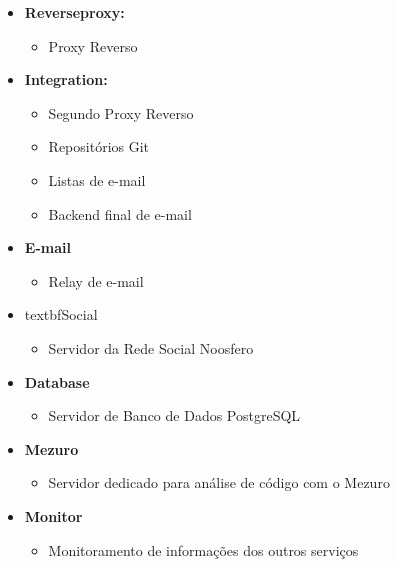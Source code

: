 \begin{itemize}
  \item \textbf{Reverseproxy:}
  \begin{itemize}
    \item Proxy Reverso
  \end{itemize}

  \item \textbf{Integration:}
    \begin{itemize}
      \item Segundo Proxy Reverso
      \item Repositórios Git
      \item Listas de e-mail
      \item Backend final de e-mail
    \end{itemize}

  \item \textbf{E-mail}
  \begin{itemize}
    \item Relay de e-mail
  \end{itemize}

  \item textbf{Social}
  \begin{itemize}
    \item Servidor da Rede Social Noosfero
  \end{itemize}

  \item \textbf{Database}
  \begin{itemize}
    \item{Servidor de Banco de Dados PostgreSQL}
  \end{itemize}

  \item \textbf{Mezuro}
  \begin{itemize}
    \item Servidor dedicado para análise de código com o Mezuro
  \end{itemize}

  \item \textbf{Monitor}
  \begin{itemize}
    \item Monitoramento de informações dos outros serviços
  \end{itemize}
\end{itemize}

